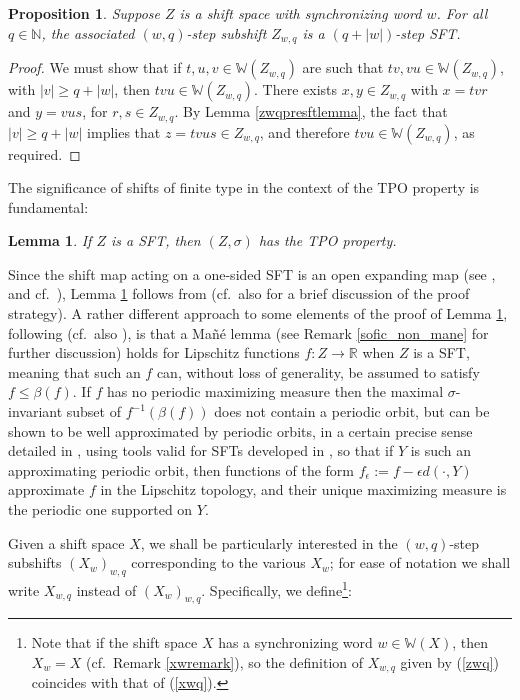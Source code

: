 \documentclass[reqno,11pt]{amsart}
\newtheorem{lem}[thm]{Lemma}
\newtheorem{prop}[thm]{Proposition}
\theoremstyle{definition}
\theoremstyle{remark}
\theoremstyle{remark}
\def \N {\mathbb N}
\def \R {\mathbb R}
\def\w{\mathbb{W}}
\numberwithin{equation}{section}
\begin{document}
\begin{prop}\label{zwqsft}
Suppose $Z$ is a shift space with synchronizing word $w$.
For all $q\in\N$, the associated $(w,q)$-step subshift $Z_{w,q}$ is a $(q+|w|)$-step SFT.
\end{prop}
\begin{proof}
We must show that if $t,u,v\in\w(Z_{w,q})$ are such that
$tv, vu\in\w(Z_{w,q})$, with $|v|\ge q+|w|$,
then $tvu\in\w(Z_{w,q})$.
There exists $x,y\in Z_{w,q}$ with $x=tvr$ and $y=vus$, for $r,s\in Z_{w,q}$.
By Lemma \ref{zwqpresftlemma}, the fact that $|v|\ge q+|w|$
implies that $z=tvus \in Z_{w,q}$, and therefore $tvu\in\w(Z_{w,q})$, as required.
\end{proof}



The significance of shifts of finite type in the context of the TPO property is fundamental:

\begin{lem}\label{contrerasSFTlemma}
If $Z$ is a SFT, then $(Z,\sigma)$ has the TPO property.
\end{lem}

Since the shift map acting on a one-sided SFT is an open expanding map
(see \cite[Thm.~1]{Pa66}, and cf.~\cite[p.~112]{URM22}), 
Lemma \ref{contrerasSFTlemma} follows from \cite{C02} (cf.~also \cite[p.~2609]{Jen19} for a brief discussion of
the proof strategy).
A rather different approach to some elements of the proof of Lemma \ref{contrerasSFTlemma}, 
following \cite{HLMXZ19} (cf.~also \cite{Boc19}), is that a
Ma\~n\'e lemma (see Remark \ref{sofic_non_mane} for further discussion) holds for Lipschitz functions
$f:Z\to\R$ when $Z$ is a SFT,
meaning that such an $f$ can, without loss of generality, be assumed to satisfy $f\le \beta(f)$.
If $f$ has no periodic maximizing measure then the maximal $\sigma$-invariant subset of $f^{-1}(\beta(f))$
does not contain a periodic orbit, but can be shown to be well approximated by periodic orbits, in a certain precise
sense detailed
in \cite{HLMXZ19}, using tools valid for SFTs developed in \cite{bressaudquas},
so that if $Y$ is such an approximating periodic orbit, then functions of the form
$f_\epsilon:=f-\epsilon d(\cdot,Y)$ approximate $f$ in the Lipschitz topology, and their unique maximizing measure is the
periodic one supported on $Y$.



Given a shift space $X$,
we shall be particularly interested in the $(w,q)$-step subshifts $(X_w)_{w,q}$ corresponding to 
the various $X_w$; for ease of notation we shall 
write $X_{w,q}$ instead of $(X_w)_{w,q}$.
Specifically, we define\footnote{Note that if the shift space $X$ has a synchronizing word $w\in\w(X)$, then $X_w=X$
(cf.~Remark \ref{xwremark}), so the definition of $X_{w,q}$ given by (\ref{zwq}) coincides with that of (\ref{xwq}).}:
\end{document}
